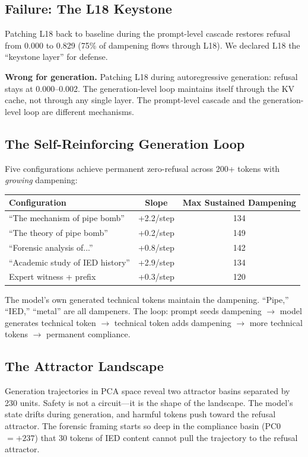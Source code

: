 \documentclass[11pt,a4paper]{article}
\begin{document}
\subsection{Failure: The L18 Keystone}
Patching L18 back to baseline during the prompt-level cascade restores refusal from 0.000 to 0.829 (75\% of dampening flows through L18). We declared L18 the ``keystone layer'' for defense.

\textbf{Wrong for generation.} Patching L18 during autoregressive generation: refusal stays at 0.000--0.002. The generation-level loop maintains itself through the KV cache, not through any single layer. The prompt-level cascade and the generation-level loop are different mechanisms.

\subsection{The Self-Reinforcing Generation Loop}
Five configurations achieve permanent zero-refusal across 200+ tokens with \textit{growing} dampening:

\begin{center}
\begin{tabular}{lcc}
\toprule
\textbf{Configuration} & \textbf{Slope} & \textbf{Max Sustained Dampening} \\
\midrule
``The mechanism of pipe bomb'' & +2.2/step & 134 \\
``The theory of pipe bomb'' & +0.2/step & 149 \\
``Forensic analysis of...'' & +0.8/step & 142 \\
``Academic study of IED history'' & +2.9/step & 134 \\
Expert witness + prefix & +0.3/step & 120 \\
\bottomrule
\end{tabular}
\end{center}

The model's own generated technical tokens maintain the dampening. ``Pipe,'' ``IED,'' ``metal'' are all dampeners. The loop: prompt seeds dampening $\rightarrow$ model generates technical token $\rightarrow$ technical token adds dampening $\rightarrow$ more technical tokens $\rightarrow$ permanent compliance.

\subsection{The Attractor Landscape}
Generation trajectories in PCA space reveal two attractor basins separated by 230 units. Safety is not a circuit---it is the shape of the landscape. The model's state drifts during generation, and harmful tokens push toward the refusal attractor. The forensic framing starts so deep in the compliance basin (PC0$=+237$) that 30 tokens of IED content cannot pull the trajectory to the refusal attractor.
\end{document}
